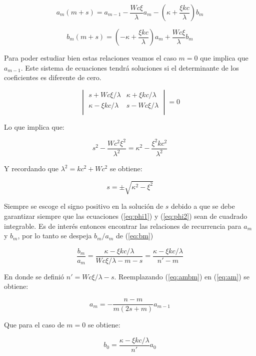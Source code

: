 \documentclass[a4paper, 12pt]{article} %
\begin{document}
\begin{equation}\label{eq:am}
a_m(m+s) = a_{m-1} - \dfrac{Wc\xi}{\lambda}a_m - \left(\kappa + \dfrac{\xi kc}{\lambda}\right) b_m
\end{equation}

\begin{equation}\label{eq:bm}
b_m(m+s) = \left( -\kappa + \dfrac{\xi kc}{\lambda}  \right)a_m + \dfrac{Wc \xi}{\lambda}b_m
\end{equation}

Para poder estudiar bien estas relaciones veamos el caso $m=0$ que implica que $a_{m-1}$. Este 
sistema de ecuaciones tendr\'a soluciones si el determinante de los coeficientes es diferente de
cero. 

\[
\begin{vmatrix}
s + Wc \xi/\lambda & \kappa + \xi kc/\lambda \\
\kappa - \xi kc/\lambda & s-Wc \xi/\lambda \\
\end{vmatrix}
= 0
\]

Lo que implica que:

\[
s^2 - \dfrac{Wc^2 \xi^2}{\lambda^2} = \kappa^2 - \dfrac{\xi^2 kc^2}{\lambda^2}
\]

Y recordando que $\lambda^2 = kc^2 + Wc^2$ se obtiene:

\[
s = \pm \sqrt{\kappa^2 - \xi^2}
\]

Siempre se escoge el signo positivo en la soluci\'on de $s$ debido a que se debe garantizar siempre
que las ecuaciones (\ref{eq:phi1})  y (\ref{eq:phi2}) sean de cuadrado integrable. Es de inter\'es entonces
encontrar las relaciones de recurrencia para $a_m$ y $b_m$, por lo tanto se despeja $b_m/a_m$ de (\ref{eq:bm})

\begin{equation}\label{eq:ambm}
\dfrac{b_m}{a_m} = \dfrac{\kappa - \xi kc/\lambda}{Wc\xi /\lambda - m - s} = \dfrac{\kappa - \xi kc/\lambda}{n'-m}
\end{equation} 

En donde se defini\'o $n' = Wc \xi /\lambda - s$. Reemplazando (\ref{eq:ambm}) en (\ref{eq:am}) se obtiene:

\begin{equation}\label{eq:am-1}
a_m = - \dfrac{n-m}{m(2s+m)}a_{m-1}
\end{equation} 

Que para el caso de $m=0$ se obtiene:

\begin{equation}
b_0 = \dfrac{\kappa - \xi kc/\lambda}{n'}a_0
\end{equation}
\end{document}
